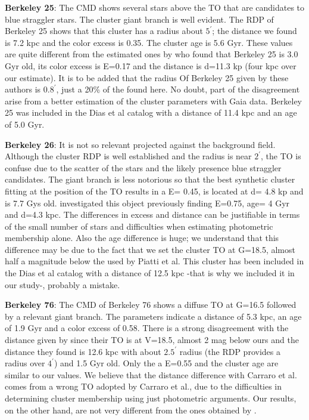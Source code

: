 \documentclass{aa}
\begin{document}
\textbf{Berkeley 25}:
The CMD shows several stars above the TO that are candidates to blue straggler stars. The cluster giant branch is well evident. The RDP of Berkeley 25 shows that this cluster has a radius about $5^{\prime}$; the distance we found is 7.2 kpc and the color excess is 0.35. The cluster age is 5.6 Gyr. These values are quite different from the estimated ones by \cite{2005A&A...442..917C} who found that Berkeley 25 is 3.0 Gyr old, its color excess is E=0.17 and the distance is d=11.3 kp (four kpc over our estimate). It is to be added that the radius Of Berkeley 25 given by these authors is $0.8^{\prime}$, just a 20\% of the found here. No doubt, part of the disagreement arise from a better estimation of the cluster parameters with Gaia data.  Berkeley 25 was included in the Dias et al catalog with a distance of 11.4 kpc and an age of 5.0 Gyr.

\textbf{Berkeley 26}:
It is not so relevant projected against the background field. Although the cluster RDP is well established and the radius is near $2^{\prime}$, the TO is confuse due to the scatter of the stars and the likely presence blue straggler candidates. The giant branch is less notorious so that the best synthetic cluster fitting at the position of the TO results in a  E= 0.45, is located at d= 4.8 kp and is 7.7 Gys old. \cite{2010MNRAS.402.2720P} investigated this object previously finding  E=0.75, age= 4 Gyr and d=4.3 kpc. The differences in excess and distance can be justifiable in terms of the small number of stars and difficulties when estimating photometric membership alone. Also the age difference is huge; we understand that this difference may be due to the fact that we set the cluster TO at G=18.5, almost half a magnitude below the used by Piatti et al. This cluster has been included in the Dias et al catalog with a distance of 12.5 kpc -that is why we included it in our study-, probably a mistake.


\textbf{Berkeley 76}:
The CMD of Berkeley 76 shows a diffuse TO at G=16.5 followed by a relevant giant branch. The parameters indicate a distance of 5.3 kpc, an age of 1.9 Gyr and a color excess of 0.58. There is a strong disagreement with the distance given by \cite{2013MNRAS.428..502C} since their TO is at V=18.5, almost 2 mag below ours and the distance they found is 12.6 kpc with about $2.5^{\prime}$ radius (the RDP provides a radius over $4^{\prime}$) and 1.5 Gyr old. Only the a E=0.55 and the cluster age are similar to our values. We believe that the distance difference with Carraro et al. comes from a wrong TO adopted by Carraro et al., due to the difficulties in determining cluster membership using just photometric arguments. Our results, on the other hand, are not very different from the ones obtained by \cite{Cantat_2020}. 
\end{document}

